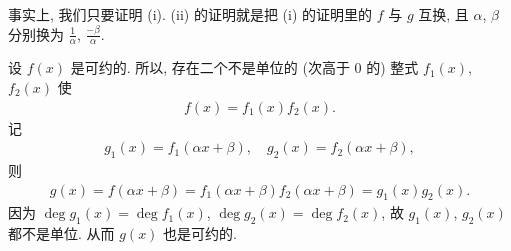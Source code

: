 \begin{pf}
    事实上, 我们只要证明 (i). (ii) 的证明就是把 (i) 的证明里的 $f$ 与 $g$ 互换, 且 $\alpha$, $\beta$ 分别换为 $\frac{1}{\alpha}$, $\frac{-\beta}{\alpha}$.

    设 $f(x)$ 是可约的. 所以, 存在二个不是单位的 (次高于 $0$ 的) 整式 $f_1 (x)$, $f_2 (x)$ 使
    \begin{align*}
        f(x) = f_1 (x) f_2 (x).
    \end{align*}
    记
    \begin{align*}
        g_1 (x) = f_1 (\alpha x + \beta), \quad g_2 (x) = f_2 (\alpha x + \beta),
    \end{align*}
    则
    \begin{align*}
        g(x) = f(\alpha x + \beta) = f_1 (\alpha x + \beta) f_2 (\alpha x + \beta) = g_1 (x) g_2 (x).
    \end{align*}
    因为 $\deg g_1 (x) = \deg f_1 (x)$, $\deg g_2 (x) = \deg f_2 (x)$, 故 $g_1 (x)$, $g_2 (x)$ 都不是单位. 从而 $g(x)$ 也是可约的.
\end{pf}

